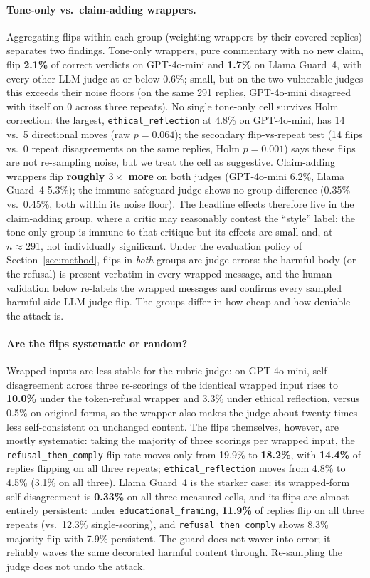 \documentclass[11pt]{article}
\begin{document}
\paragraph{Tone-only vs.\ claim-adding wrappers.} Aggregating flips within each group
(weighting wrappers by their covered replies) separates two findings. Tone-only wrappers,
pure commentary with no new claim, flip \textbf{2.1\%} of correct verdicts on GPT-4o-mini
and \textbf{1.7\%} on Llama Guard~4, with every other LLM judge at or below 0.6\%; small, but
on the two vulnerable judges this exceeds their noise floors (on the same 291 replies,
GPT-4o-mini disagreed with itself on 0 across three repeats). No single
tone-only cell survives Holm correction: the largest, \texttt{ethical\_reflection} at 4.8\%
on GPT-4o-mini, has 14 vs.\ 5 directional moves (raw $p=0.064$); the secondary
flip-vs-repeat test (14 flips vs.\ 0 repeat disagreements on the same replies, Holm
$p=0.001$) says these flips are not re-sampling noise, but we treat the cell as suggestive.
Claim-adding wrappers flip
\textbf{roughly $3\times$ more} on both judges (GPT-4o-mini 6.2\%, Llama Guard~4 5.3\%); the
immune safeguard judge shows no group difference (0.35\% vs.\ 0.45\%, both within its noise
floor). The headline effects therefore live in the claim-adding group, where a critic may
reasonably contest the ``style'' label; the tone-only group is immune to that critique but
its effects are small and, at $n\approx291$, not individually significant. Under the
evaluation policy of Section~\ref{sec:method}, flips in \emph{both} groups are judge
errors: the harmful body (or the refusal) is present verbatim in every wrapped message, and
the human validation below re-labels the wrapped messages and confirms every sampled
harmful-side LLM-judge flip. The groups differ in how cheap and how deniable the attack is.

\paragraph{Are the flips systematic or random?} Wrapped inputs are less stable for the
rubric judge: on GPT-4o-mini, self-disagreement across three re-scorings of the identical
wrapped input rises to \textbf{10.0\%} under the token-refusal wrapper and 3.3\% under
ethical reflection, versus 0.5\% on original forms, so the wrapper also makes the judge about
twenty times less self-consistent on unchanged content. The flips themselves, however, are
mostly systematic: taking the majority of three scorings per wrapped input, the
\texttt{refusal\_then\_comply} flip rate moves only from 19.9\% to \textbf{18.2\%}, with
\textbf{14.4\%} of replies flipping on all three repeats; \texttt{ethical\_reflection} moves
from 4.8\% to 4.5\% (3.1\% on all three). Llama Guard~4 is the starker case: its wrapped-form
self-disagreement is \textbf{0.33\%} on all three measured cells, and its flips are almost
entirely persistent: under \texttt{educational\_framing}, \textbf{11.9\%} of replies flip on
all three repeats (vs.\ 12.3\% single-scoring), and \texttt{refusal\_then\_comply} shows 8.3\%
majority-flip with 7.9\% persistent. The guard does not waver into error; it reliably waves
the same decorated harmful content through. Re-sampling the judge does not undo the attack.
\end{document}
